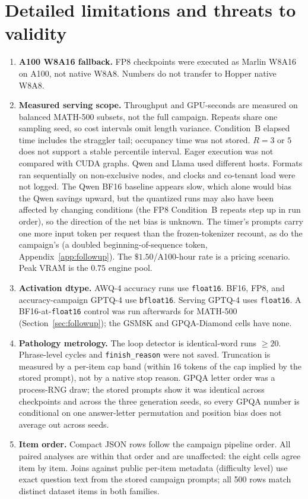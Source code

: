 \documentclass[11pt,a4paper]{article}
\begin{document}
\section{Detailed limitations and threats to validity}
\label{app:limitations}
\begin{enumerate}
    \item \textbf{A100 W8A16 fallback.} FP8 checkpoints were executed as Marlin W8A16 on A100, not native W8A8. Numbers do not transfer to Hopper native W8A8.
    \item \textbf{Measured serving scope.} Throughput and GPU-seconds are measured on balanced MATH-500 subsets, not the full campaign. Repeats share one sampling seed, so cost intervals omit length variance. Condition~B elapsed time includes the straggler tail; occupancy time was not stored. $R=3$ or $5$ does not support a stable percentile interval. Eager execution was not compared with CUDA graphs. Qwen and Llama used different hosts. Formats ran sequentially on non-exclusive nodes, and clocks and co-tenant load were not logged. The Qwen BF16 baseline appears slow, which alone would bias the Qwen savings upward, but the quantized runs may also have been affected by changing conditions (the FP8 Condition~B repeats step up in run order), so the direction of the net bias is unknown. The timer's prompts carry one more input token per request than the frozen-tokenizer recount, as do the campaign's (a doubled beginning-of-sequence token, Appendix~\ref{app:followup}). The $\$1.50$/A100-hour rate is a pricing scenario. Peak VRAM is the $0.75$ engine pool.
    \item \textbf{Activation dtype.} AWQ-4 accuracy runs use \texttt{float16}. BF16, FP8, and accuracy-campaign GPTQ-4 use \texttt{bfloat16}. Serving GPTQ-4 uses \texttt{float16}. A BF16-at-\texttt{float16} control was run afterwards for MATH-500 (Section~\ref{sec:followup}); the GSM8K and GPQA-Diamond cells have none.
    \item \textbf{Pathology metrology.} The loop detector is identical-word runs $\ge 20$. Phrase-level cycles and \texttt{finish\_reason} were not saved. Truncation is measured by a per-item cap band (within 16 tokens of the cap implied by the stored prompt), not by a native stop reason. GPQA letter order was a process-RNG draw; the stored prompts show it was identical across checkpoints and across the three generation seeds, so every GPQA number is conditional on one answer-letter permutation and position bias does not average out across seeds.
    \item \textbf{Item order.} Compact JSON rows follow the campaign pipeline order. All paired analyses are within that order and are unaffected: the eight cells agree item by item. Joins against public per-item metadata (difficulty level) use exact question text from the stored campaign prompts; all 500 rows match distinct dataset items in both families.

\end{enumerate}
\end{document}
